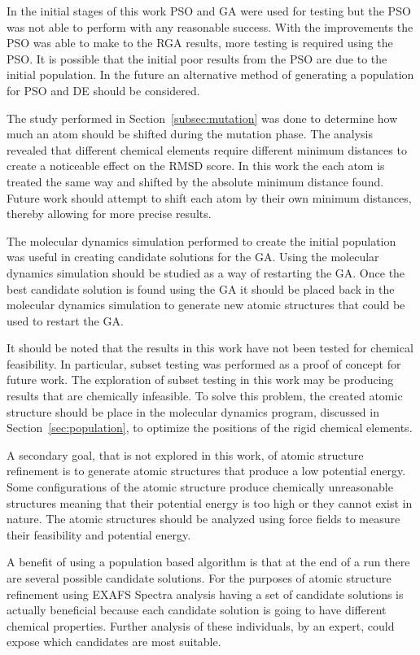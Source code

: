 \documentclass[conference]{IEEEtran}
\begin{document}
In the initial stages of this work PSO and GA were used for testing but the PSO was not able to perform with any reasonable success. With the improvements the PSO was able to make to the RGA results, more testing is required using the PSO. It is possible that the initial poor results from the PSO are due to the initial population. In the future an alternative method of generating a population for PSO and DE should be considered.

The study performed in Section~\ref{subsec:mutation} was done to determine how much an atom should be shifted during the mutation phase. The analysis revealed that different chemical elements require different minimum distances to create a noticeable effect on the RMSD score. In this work the each atom is treated the same way and shifted by the absolute minimum distance found. Future work should attempt to shift each atom by their own minimum distances, thereby allowing for more precise results.

The molecular dynamics simulation performed to create the initial population was useful in creating candidate solutions for the GA. Using the molecular dynamics simulation should be studied as a way of restarting the GA. Once the best candidate solution is found using the GA it should be placed back in the molecular dynamics simulation to generate new atomic structures that could be used to restart the GA.

It should be noted that the results in this work have not been tested for chemical feasibility. In particular, subset testing was performed as a proof of concept for future work. The exploration of subset testing in this work may be producing results that are chemically infeasible. To solve this problem, the created atomic structure should be place in the molecular dynamics program,  discussed in Section~\ref{sec:population}, to optimize the positions of the rigid chemical elements.

A secondary goal, that is not explored in this work, of atomic structure refinement is to generate atomic structures that produce a low potential energy. Some configurations of the atomic structure produce chemically unreasonable structures meaning that their potential energy is too high or they cannot exist in nature. The atomic structures should be analyzed using force fields to measure their feasibility and potential energy.

A benefit of using a population based algorithm is that at the end of a run there are several possible candidate solutions. For the purposes of atomic structure refinement using EXAFS Spectra analysis having a set of candidate solutions is actually beneficial because each candidate solution is going to have different chemical properties. Further analysis of these individuals, by an expert, could expose which candidates are most suitable.
\end{document}
